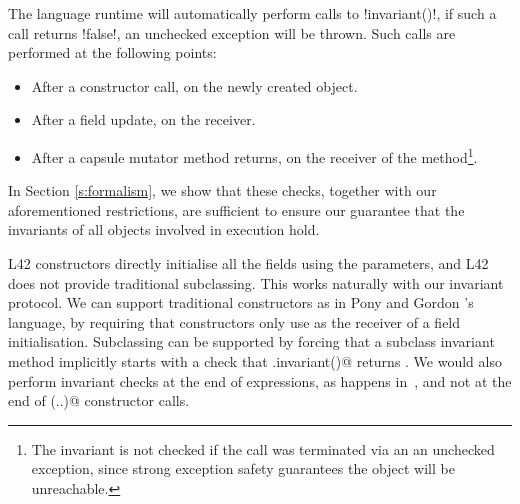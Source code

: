 



The language runtime will automatically perform calls to \Q!invariant()!, if such a call returns \Q!false!, an unchecked exception will be thrown. Such calls are performed at the following points:
\begin{itemize}
	\item After a constructor call, on the newly created object.
	\item After a field update, on the receiver.
	\item After a capsule mutator method returns, on the receiver of the method\footnote{The invariant is not checked if the call was terminated via an an unchecked exception, since strong exception safety guarantees the object will be unreachable.}.
\end{itemize}
\noindent In Section \ref{s:formalism}, we show that these checks, together with our aforementioned restrictions, are sufficient to ensure our guarantee that the invariants of all objects involved in execution hold. %

L42 constructors directly initialise all the fields using the parameters, and L42 does not provide traditional subclassing.
This works naturally with our invariant protocol.
We can support traditional constructors as in Pony and Gordon \etal's language, 
by requiring that constructors only use \Q@this@ as the receiver of a field initialisation.
Subclassing can be supported by forcing that a subclass invariant method implicitly starts with a check that \Q@super.invariant()@ returns \Q@true@. We would also perform invariant checks at the end of \Q@new@ expressions, as happens in~\cite{feldman2006jose}, and not at the end of \Q@super(..)@ constructor calls.
